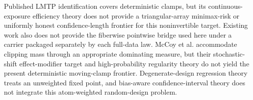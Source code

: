 Published LMTP identification covers deterministic clamps, but its continuous-exposure efficiency theory does not provide a triangular-array minimax-risk or uniformly honest confidence-length frontier for this noninvertible target. Existing work also does not provide the fiberwise pointwise bridge used here under a carrier packaged separately by each full-data law. McCoy et al. accommodate clipping mass through an appropriate dominating measure, but their stochastic-shift effect-modifier target and high-probability regularity theory do not yield the present deterministic moving-clamp frontier. Degenerate-design regression theory treats an unweighted fixed point, and bias-aware confidence-interval theory does not integrate this atom-weighted random-design problem.